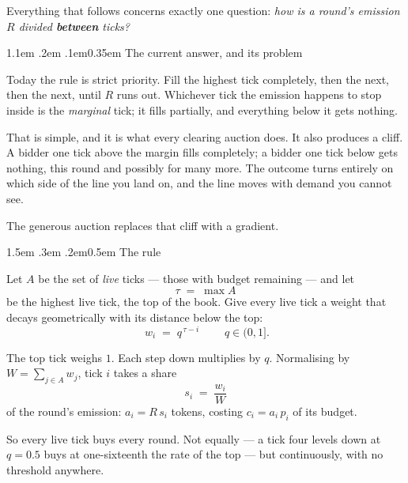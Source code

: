 \documentclass[11pt]{article}
\makeatletter
\renewcommand\section{\@startsection{section}{1}{\z@}%
  {1.5em \@plus .3em \@minus .2em}{0.5em}%
  {\sffamily\large\bfseries\color{accent}}}
\renewcommand\subsection{\@startsection{subsection}{2}{\z@}%
  {1.1em \@plus .2em \@minus .1em}{0.35em}%
  {\sffamily\normalsize\bfseries\color{ink}}}
\makeatother
\begin{document}
Everything that follows concerns exactly one question: \emph{how is a round's emission $R$
divided \textbf{between} ticks?}

\subsection{The current answer, and its problem}
\label{sec:v1}

Today the rule is strict priority. Fill the highest tick completely, then the next, then the
next, until $R$ runs out. Whichever tick the emission happens to stop inside is the
\emph{marginal} tick; it fills partially, and everything below it gets nothing.

That is simple, and it is what every clearing auction does. It also produces a cliff. A bidder
one tick above the margin fills completely; a bidder one tick below gets nothing, this round
and possibly for many more. The outcome turns entirely on which side of the line you land on,
and the line moves with demand you cannot see.

The generous auction replaces that cliff with a gradient.

\section{The rule}

Let $A$ be the set of \emph{live} ticks — those with budget remaining — and let
\[
  \tau \;=\; \max A
\]
be the highest live tick, the top of the book. Give every live tick a weight that decays
geometrically with its distance below the top:
\[
  \boxed{\;w_i \;=\; q^{\,\tau-i}\;}\qquad q\in(0,1].
\]

The top tick weighs $1$. Each step down multiplies by $q$. Normalising by
$W=\sum_{j\in A}w_j$, tick $i$ takes a share
\[
  s_i \;=\; \frac{w_i}{W}
\]
of the round's emission: $a_i = R\,s_i$ tokens, costing $c_i = a_i\,p_i$ of its budget.

So every live tick buys every round. Not equally — a tick four levels down at $q=0.5$ buys at
one-sixteenth the rate of the top — but continuously, with no threshold anywhere.
\end{document}
